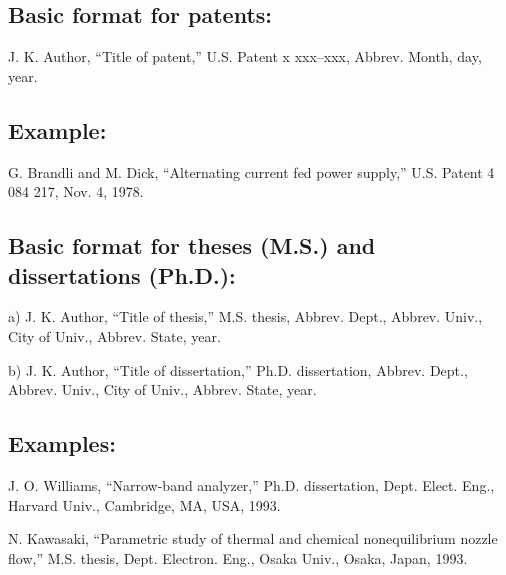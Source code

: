 \documentclass[journal]{IEEEtai}
\begin{document}
\subsection*{Basic format for patents:}\vspace*{-12pt}
\begin{thebibliography}{34}
\item[] J. K. Author, ``Title of patent,'' U.S. Patent x xxx--xxx, Abbrev. Month, day, year.
\end{thebibliography}


\subsection*{Example:}\vspace*{-12pt}

\begin{thebibliography}{34}
\setcounter{enumiv}{23}

\bibitem{}G. Brandli and M. Dick, ``Alternating current fed power supply,'' U.S. Patent 4 084 217, Nov. 4, 1978.
\end{thebibliography}

\subsection*{Basic format for theses (M.S.) and dissertations (Ph.D.):}\vspace*{-12pt}
\begin{thebibliography}{34}
\item[a)] J. K. Author, ``Title of thesis,'' M.S. thesis, Abbrev. Dept., Abbrev. Univ., City of Univ., Abbrev. State, year.

\item[b)] J. K. Author, ``Title of dissertation,'' Ph.D. dissertation, Abbrev. Dept., Abbrev. Univ., City of Univ., Abbrev. State, year.
\end{thebibliography}

\subsection*{Examples:}\vspace*{-12pt}

\begin{thebibliography}{34}
\setcounter{enumiv}{24}

\bibitem{}J. O. Williams, ``Narrow-band analyzer,'' Ph.D. dissertation, Dept. Elect. Eng., Harvard Univ., Cambridge, MA, USA, 1993.

\bibitem{}N. Kawasaki, ``Parametric study of thermal and chemical nonequilibrium nozzle flow,'' M.S. thesis, Dept. Electron. Eng., Osaka Univ., Osaka, Japan, 1993.
\end{thebibliography}
\end{document}

